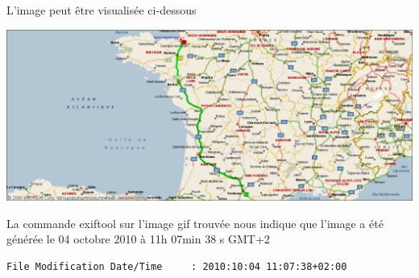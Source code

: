 \documentclass[a4paper,11pt]{article}
\begin{document}
L'image peut être visualisée ci-dessous 

\includegraphics[width=\textwidth]{image_map.png}

La commande exiftool sur l'image gif trouvée nous indique que l'image a été générée le 04
octobre 2010 à 11h 07min 38 s GMT+2
\begin{verbatim}
File Modification Date/Time     : 2010:10:04 11:07:38+02:00
\end{verbatim}
\end{document}

